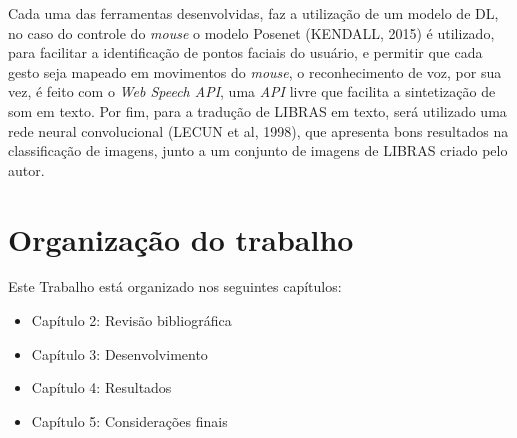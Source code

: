 Cada uma das ferramentas desenvolvidas, faz a utilização de um modelo de DL, no caso do controle do \textit{mouse} o modelo Posenet (KENDALL, 2015) é utilizado, para facilitar a identificação de pontos faciais do usuário, e permitir que cada gesto seja mapeado em movimentos do \textit{mouse}, o reconhecimento de voz, por sua vez, é feito com o \textit{Web Speech API}, uma \textit{API} livre que facilita a sintetização de som em texto. Por fim, para a tradução de LIBRAS em texto, será utilizado uma rede neural convolucional (LECUN et al, 1998), que apresenta bons resultados na classificação de imagens, junto a um conjunto de imagens de LIBRAS criado pelo autor.


\section{Organização do trabalho}

Este Trabalho está organizado nos seguintes capítulos:

\begin{itemize}
	\item Capítulo 2: Revisão bibliográfica %
	\item Capítulo 3: Desenvolvimento %
	\item Capítulo 4: Resultados %
	\item Capítulo 5: Considerações finais %
\end{itemize}
